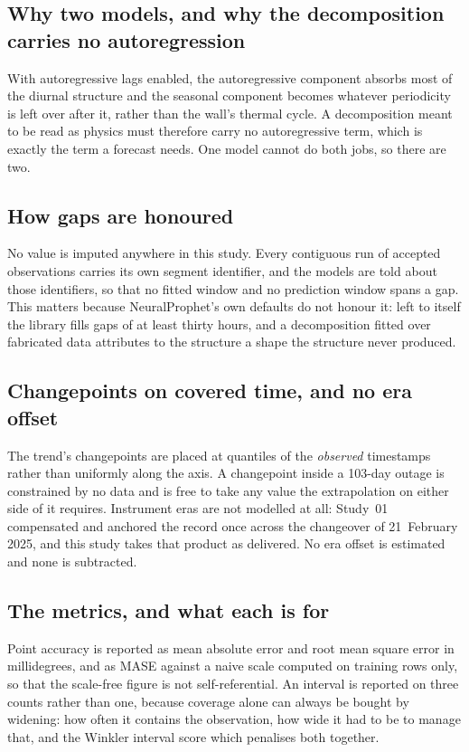 \documentclass[11pt,a4paper]{article}
\begin{document}
\subsection{Why two models, and why the decomposition carries no autoregression}

With autoregressive lags enabled, the autoregressive component absorbs most of
the diurnal structure and the seasonal component becomes whatever periodicity is
left over after it, rather than the wall's thermal cycle. A decomposition meant
to be read as physics must therefore carry no autoregressive term, which is
exactly the term a forecast needs. One model cannot do both jobs, so there are
two.

\subsection{How gaps are honoured}

No value is imputed anywhere in this study. Every contiguous run of accepted
observations carries its own segment identifier, and the models are told about
those identifiers, so that no fitted window and no prediction window spans a
gap. This matters because NeuralProphet's own defaults do not honour it: left to
itself the library fills gaps of at least thirty hours, and a decomposition
fitted over fabricated data attributes to the structure a shape the structure
never produced.

\subsection{Changepoints on covered time, and no era offset}

The trend's changepoints are placed at quantiles of the \emph{observed}
timestamps rather than uniformly along the axis. A changepoint inside a 103-day
outage is constrained by no data and is free to take any value the extrapolation
on either side of it requires. Instrument eras are not modelled at all: Study~01
compensated and anchored the record once across the changeover of
21~February 2025, and this study takes that product as delivered. No era offset
is estimated and none is subtracted.

\subsection{The metrics, and what each is for}

Point accuracy is reported as mean absolute error and root mean square error in
millidegrees, and as MASE against a naive scale computed on training rows only,
so that the scale-free figure is not self-referential. An interval is reported
on three counts rather than one, because coverage alone can always be bought by
widening: how often it contains the observation, how wide it had to be to manage
that, and the Winkler interval score which penalises both together.
\end{document}
